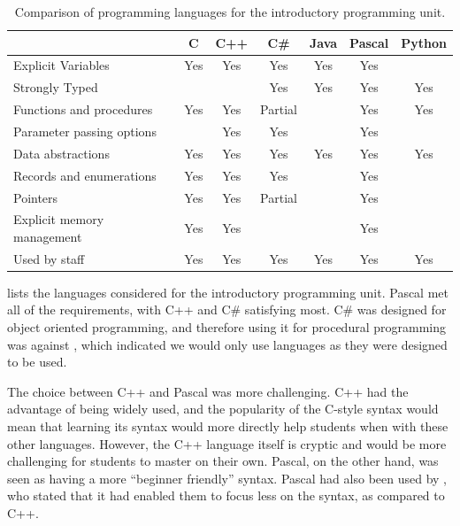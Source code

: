 \begin{table}[hb]
	\renewcommand{\arraystretch}{1.6}
	\centering
	\caption{Comparison of programming languages for the introductory programming unit.}
 	\label{tbl:language_comparison}

    \begin{tabular}{l|c|c|c|c|c|c}
    ~                                   & C   & C++ & C\#     & Java & Pascal & Python \\ \hline
    Explicit Variables                  & Yes & Yes & Yes     & Yes  & Yes    & ~      \\
    Strongly Typed                      & ~   & ~   & Yes     & Yes  & Yes    & Yes    \\
    Functions and procedures            & Yes & Yes & Partial & ~    & Yes    & Yes    \\
    Parameter passing options & ~   & Yes & Yes     & ~    & Yes    & ~     \\
    Data abstractions     & Yes & Yes & Yes     & Yes  & Yes    & Yes    \\
    Records and enumerations  & Yes & Yes & Yes     & ~    & Yes    & ~      \\
    Pointers                            & Yes & Yes & Partial & ~    & Yes    & ~      \\
    Explicit memory management & Yes & Yes & ~ & ~    & Yes    & ~      \\
    Used by staff     & Yes & Yes & Yes     & Yes  & Yes    & Yes    \\
    \end{tabular}
\end{table}

 lists the languages considered for the introductory programming unit. Pascal met all of the requirements, with C++ and C\# satisfying most. C\# was designed for object oriented programming, and therefore using it for procedural programming was against , which indicated we would only use languages as they were designed to be used. 

The choice between C++ and Pascal was more challenging. C++ had the advantage of being widely used, and the popularity of the C-style syntax would mean that learning its syntax would more directly help students when with these other languages. However, the C++ language itself is cryptic and would be more challenging for students to master on their own. Pascal, on the other hand, was seen as having a more ``beginner friendly'' syntax. Pascal had also been used by \citet{Becker:2002}, who stated that it had enabled them to focus less on the syntax, as compared to C++.


